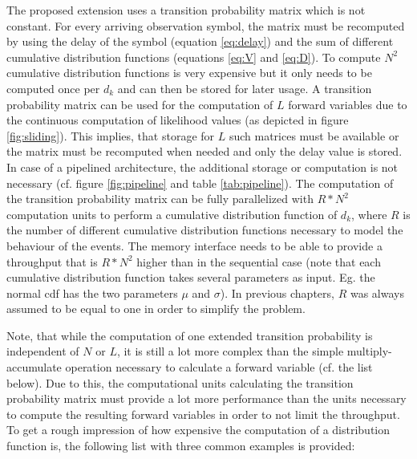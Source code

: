 \documentclass[mscthesis]{usiinfthesis}
\begin{document}
The proposed extension uses a transition probability matrix which is not
constant. For every arriving observation symbol, the matrix must be recomputed
by using the delay of the symbol (equation \ref{eq:delay}) and the sum of
different cumulative distribution functions (equations \ref{eq:V} and
\ref{eq:D}). To compute $N^2$ cumulative distribution functions is very
expensive but it only needs to be computed once per $d_k$ and can then be
stored for later usage.  A transition probability matrix can be used for the
computation of $L$ forward variables due to the continuous computation of
likelihood values (as depicted in figure \ref{fig:sliding}). This implies, that
storage for $L$ such matrices must be available or the matrix must be
recomputed when needed and only the delay value is stored. In case of
a pipelined architecture, the additional storage or computation is not
necessary (cf. figure \ref{fig:pipeline} and table \ref{tab:pipeline}). The
computation of the transition probability matrix can be fully parallelized with
$R*N^2$ computation units to perform a cumulative distribution function of
$d_k$, where $R$ is the number of different cumulative distribution functions
necessary to model the behaviour of the events. The memory interface needs to
be able to provide a throughput that is $R*N^2$ higher than in the sequential
case (note that each cumulative distribution function takes several parameters
as input. Eg. the normal cdf has the two parameters $\mu$ and $\sigma$). In
previous chapters, $R$ was always assumed to be equal to one in order to
simplify the problem.

Note, that while the computation of one extended transition probability is
independent of $N$ or $L$, it is still a lot more complex than the simple
multiply-accumulate operation necessary to calculate a forward variable (cf.
the list below). Due to this, the computational units calculating the
transition probability matrix must provide a lot more performance than the
units necessary to compute the resulting forward variables in order to not
limit the throughput. To get a rough impression of how expensive the
computation of a distribution function is, the following list with three common
examples is provided:
\end{document}
